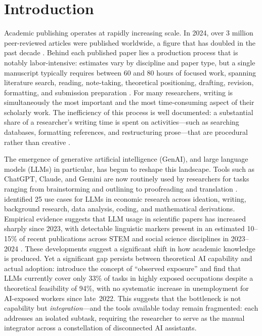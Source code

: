 \documentclass{article}
\begin{document}
\section{Introduction}

Academic publishing operates at rapidly increasing scale. In 2024, over 3 million peer-reviewed articles were published worldwide, a figure that has doubled in the past decade \citep{liang2025quantifying}. Behind each published paper lies a production process that is notably labor-intensive: estimates vary by discipline and paper type, but a single manuscript typically requires between 60 and 80 hours of focused work, spanning literature search, reading, note-taking, theoretical positioning, drafting, revision, formatting, and submission preparation \citep{korinek2023language}. For many researchers, writing is simultaneously the most important and the most time-consuming aspect of their scholarly work. The inefficiency of this process is well documented: a substantial share of a researcher's writing time is spent on activities---such as searching databases, formatting references, and restructuring prose---that are procedural rather than creative \citep{korinek2023language,siu2025augmenting}.

The emergence of generative artificial intelligence (GenAI), and large language models (LLMs) in particular, has begun to reshape this landscape. Tools such as ChatGPT, Claude, and Gemini are now routinely used by researchers for tasks ranging from brainstorming and outlining to proofreading and translation \citep{liang2025quantifying,lee2023chatgpt_medical,banh2023generative}. \citet{korinek2023language} identified 25 use cases for LLMs in economic research across ideation, writing, background research, data analysis, coding, and mathematical derivations. Empirical evidence suggests that LLM usage in scientific papers has increased sharply since 2023, with detectable linguistic markers present in an estimated 10--15\% of recent publications across STEM and social science disciplines in 2023--2024 \citep{liang2025quantifying}. These developments suggest a significant shift in how academic knowledge is produced. Yet a significant gap persists between theoretical AI capability and actual adoption: \citet{massenkoff2026labor} introduce the concept of ``observed exposure'' and find that LLMs currently cover only 33\% of tasks in highly exposed occupations despite a theoretical feasibility of 94\%, with no systematic increase in unemployment for AI-exposed workers since late~2022. This suggests that the bottleneck is not capability but \emph{integration}---and the tools available today remain fragmented: each addresses an isolated subtask, requiring the researcher to serve as the manual integrator across a constellation of disconnected AI assistants.
\end{document}

